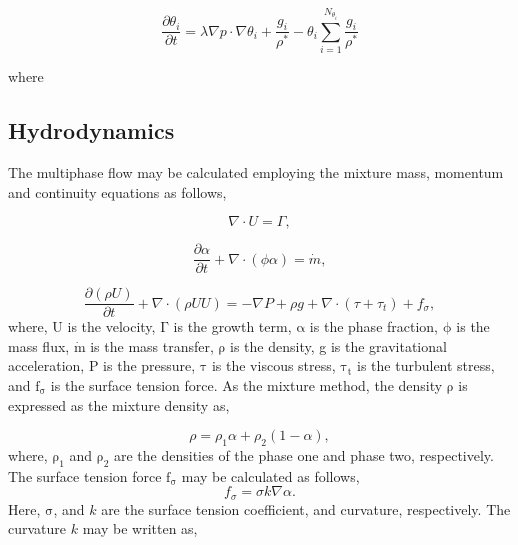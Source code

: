 \begin{equation}
    \label{eq:particulates}
    \frac{\partial \theta_i}{\partial t} = \lambda \nabla p \cdot \nabla \theta_i + \frac{g_i}{\rho^*} - \theta_i \sum_{i=1}^{N_{\theta_i}}\frac{g_i}{\rho^*}
\end{equation}

where 

\subsection{Hydrodynamics}
\label{Hydro}
The multiphase flow may be calculated employing the mixture mass, momentum and continuity equations as follows,

\begin{equation}
    \label{eq:continuity}
    \nabla \cdot U = \Gamma,
\end{equation}

\begin{equation}
    \label{eq:mass}
    \frac{\partial \alpha}{\partial t} + \nabla\cdot (\phi \alpha) = \Dot{m},
\end{equation}

\begin{equation}
    \label{eq:momentum}
    \frac{\partial (\rho U)}{\partial t} + \nabla\cdot (\rho U U) = -\nabla P + \rho g+\nabla \cdot (\tau+\tau_t)+f_{\sigma},
\end{equation}
where, U is the velocity, $\mathrm{\Gamma}$ is the growth term, $\mathrm{\alpha}$ is the phase fraction, $\mathrm{\phi}$ is the mass flux, $\mathrm{\Dot{m}}$ is the mass transfer, $\mathrm{\rho}$ is the density, g is the gravitational acceleration, P is the pressure, $\mathrm{\tau}$ is the viscous stress, $\mathrm{\tau_t}$ is the turbulent stress, and $\mathrm{f_{\sigma}}$ is the surface tension force. As the mixture method, the density $\mathrm{\rho}$ is expressed as the mixture density as,  

\begin{equation}
    \label{eq:mixtureDensity}
    \rho = \rho_1 \alpha + \rho_2 (1-\alpha),
\end{equation}
where, $\mathrm{\rho_1}$ and $\mathrm{\rho_2}$ are the densities of the phase one and phase two, respectively. The surface tension force $\mathrm{f_{\sigma}}$ may be calculated as follows,
\begin{equation}
    \label{eq:surfaceTension}
    f_{\sigma} = \sigma k \nabla\alpha.
\end{equation}
Here, $\mathrm{\sigma}$, and $k$ are the surface tension coefficient, and curvature, respectively. The curvature $k$ may be written as, 

